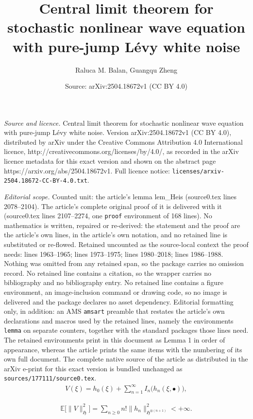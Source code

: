 \documentclass[10pt,a4paper]{amsart}
\title{Central limit theorem for stochastic nonlinear wave equation with pure-jump L\'evy white noise}
\author{Raluca M. Balan, Guangqu Zheng}
\date{Source: arXiv:2504.18672v1 (CC BY 4.0)}
\newcommand{\E}{\mathbb{E}}
\newcommand{\bul}{\bullet}
\newcommand{\fH}{\mathfrak{H}}
\begin{document}
\maketitle

\noindent\emph{Source and licence.} Central limit theorem for stochastic nonlinear wave equation with pure-jump L\'evy white noise. Version arXiv:2504.18672v1 (CC BY 4.0), distributed by arXiv under the Creative Commons Attribution 4.0 International licence, http://creativecommons.org/licenses/by/4.0/, as recorded in the arXiv licence metadata for this exact version and shown on the abstract page https://arxiv.org/abs/2504.18672v1. Full licence notice: \texttt{licenses/arxiv-2504.18672-CC-BY-4.0.txt}.\par\smallskip

\noindent\textit{Editorial scope.} Counted unit: the article's lemma lem\_Heis (source0.tex lines 2078--2104). The article's complete original proof of it is delivered with it (source0.tex lines 2107--2274, one \texttt{proof} environment of 168 lines). No mathematics is written, repaired or re-derived: the statement and the proof are the article's own lines, in the article's own notation, and no retained line is substituted or re-flowed.  Retained uncounted as the source-local context the proof needs: lines 1963--1965; lines 1973--1975; lines 1980--2018; lines 1986--1988.  Nothing was omitted from any retained span, so the package carries no omission record.  No retained line contains a citation, so the wrapper carries no bibliography and no bibliography entry.  No retained line contains a figure environment, an image-inclusion command or drawing code, so no image is delivered and the package declares no asset dependency.  Editorial formatting only, in addition: an AMS \texttt{amsart} preamble that restates the article's own declarations and macros used by the retained lines, namely the environments \texttt{lemma} on separate counters, together with the standard packages those lines need.  The retained environments print in this document as Lemma 1 in order of appearance, whereas the article prints the same items with the numbering of its own full document.  The complete native source of the article as distributed in the arXiv e-print for this exact version is bundled unchanged as \texttt{sources/177111/source0.tex}.
\begin{align}\label{227}
V(\xi) = h_0(\xi) + \sum_{n=1}^\infty I_n\big(  h_n(\xi, \bul)  \big),
\end{align}

\begin{align}\label{227b}
\E\big[ \| V\|_\fH^2 \big] = \sum_{n\geq 0} n! \| h_n \|^2_{\fH^{\otimes (n+1)}} < +\infty.
\end{align}
\end{document}
